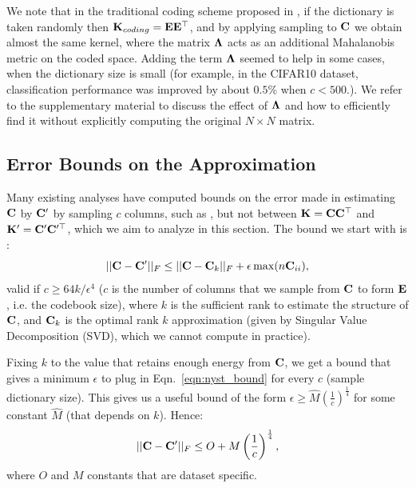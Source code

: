 We note that in the traditional coding scheme proposed in \cite{coates2011icml},  if the dictionary is taken randomly then $\mathbf{K}_{coding} = \mathbf{E} \mathbf{E}^\top$, and by applying \nystrom sampling to $\mathbf{C}$ we obtain almost the same kernel, where the matrix $\boldsymbol{\Lambda}$ acts as an additional Mahalanobis metric on the coded space.
Adding the term $\boldsymbol{\Lambda}$ seemed to help in some cases, when the dictionary size is small (for example, in the CIFAR10 dataset, classification performance was improved by about $0.5\%$ when $c<500$.). We refer to the supplementary material to discuss the effect of $\boldsymbol{\Lambda}$ and how to efficiently find it without explicitly computing the original $N\times N$ matrix. 

\subsection{Error Bounds on the Approximation}

Many existing analyses have computed bounds on the error made in estimating $\mathbf{C}$ by $\mathbf{C}'$ by sampling $c$ columns, such as \cite{talwalkar2010matrix,kumar2012sampling}, but not between $\mathbf{K} = \mathbf{C}\mathbf{C}^\top$ and $\mathbf{K}'=\mathbf{C}'\mathbf{C}'^\top$, which we aim to analyze in this section. The bound we start with is \cite{kumar2012sampling}:
\begin{equation}
\label{eqn:nyst_bound}
||\mathbf{C}-\mathbf{C}'||_F \leq ||\mathbf{C}-\mathbf{C}_k||_F + \epsilon \max(n\mathbf{C}_{ii}),
\end{equation}
valid if $c \geq 64k/\epsilon^4$ ($c$ is the number of columns that we sample from $\mathbf{C}$ to form $\mathbf{E}$, i.e. the codebook size), where $k$ is the sufficient rank to estimate the structure of $\mathbf{C}$, and $\mathbf{C}_k$ is the optimal rank $k$ approximation (given by Singular Value Decomposition (SVD), which we cannot compute in practice). %

Fixing $k$ to the value that retains enough energy from $\mathbf{C}$, we get a bound that gives a minimum $\epsilon$ to plug in Eqn.\ \ref{eqn:nyst_bound} for every $c$ (sample dictionary size). This gives us a useful bound of the form $\epsilon \geq \hat{M}\left(\frac{1}{c}\right)^{\frac{1}{4}}$ for some constant $\hat{M}$ (that depends on $k$). Hence:
\begin{equation}
||\mathbf{C}-\mathbf{C}'||_F \leq O + M\left(\frac{1}{c}\right)^{\frac{1}{4}},
\end{equation}
where $O$ and $M$ constants that are dataset specific.

